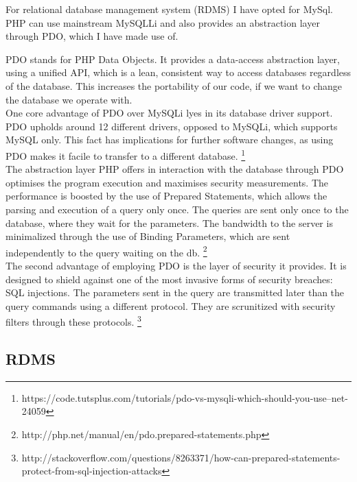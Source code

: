 For relational database management system (RDMS) I have opted for MySql. PHP can use mainstream MySQLLi and also provides an abstraction layer through PDO, which I have made use of.

PDO stands for PHP Data Objects. It provides a data-access abstraction layer, using a unified API, which is a lean, consistent way to access databases regardless of the database. This increases the portability of our code, if we want to change the database we operate with.\\

One core advantage of PDO over MySQLi lyes in its database driver support. PDO upholds around 12 different drivers, opposed to MySQLi, which supports MySQL only. This fact has implications for further software changes, as using PDO makes it facile to transfer to a different database. \footnote{https://code.tutsplus.com/tutorials/pdo-vs-mysqli-which-should-you-use--net-24059}\\  

The abstraction layer PHP offers in interaction with the database through PDO optimises the program execution and maximises security measurements.
The performance is boosted by the use of Prepared Statements, which allows the parsing and execution of a query only once. The queries are sent only once to the database, where they wait for the parameters. The bandwidth to the server is minimalized through the use of Binding Parameters, which are sent independently to the query waiting on the db. \footnote{http://php.net/manual/en/pdo.prepared-statements.php}\\ 

The second advantage of employing PDO is the layer of security it provides. It is designed to shield against one of the most invasive forms of security breaches: SQL injections. The parameters sent in the query are transmitted later than the query commands using a different protocol. They are scrunitized with security filters through these protocols. \footnote{http://stackoverflow.com/questions/8263371/how-can-prepared-statements-protect-from-sql-injection-attacks}\\ 


\subsection{RDMS} 


